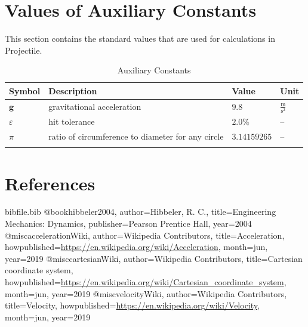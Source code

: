 \documentclass[12pt]{article}
\begin{document}
\section{Values of Auxiliary Constants}
\label{Sec:AuxConstants}
This section contains the standard values that are used for calculations in Projectile.

\begin{longtable}{l l l l}
\toprule
\textbf{Symbol} & \textbf{Description} & \textbf{Value} & \textbf{Unit}
\\
\midrule
\endhead
$\mathbf{g}$ & gravitational acceleration & $9.8$ & $\frac{\text{m}}{\text{s}^{2}}$
\\
$ε$ & hit tolerance & $2.0\%$ & --
\\
$π$ & ratio of circumference to diameter for any circle & $3.14159265$ & --
\\
\bottomrule
\caption{Auxiliary Constants}
\label{Table:TAuxConsts}
\end{longtable}
\section{References}
\label{Sec:References}
\begin{filecontents*}{bibfile.bib}
@book{hibbeler2004,
author={Hibbeler, R. C.},
title={Engineering Mechanics: Dynamics},
publisher={Pearson Prentice Hall},
year={2004}}
@misc{accelerationWiki,
author={Wikipedia Contributors},
title={Acceleration},
howpublished={\url{https://en.wikipedia.org/wiki/Acceleration}},
month=jun,
year={2019}}
@misc{cartesianWiki,
author={Wikipedia Contributors},
title={Cartesian coordinate system},
howpublished={\url{https://en.wikipedia.org/wiki/Cartesian\_coordinate\_system}},
month=jun,
year={2019}}
@misc{velocityWiki,
author={Wikipedia Contributors},
title={Velocity},
howpublished={\url{https://en.wikipedia.org/wiki/Velocity}},
month=jun,
year={2019}}
\end{filecontents*}
\nocite{*}
\printbibliography[heading=none]
\end{document}
